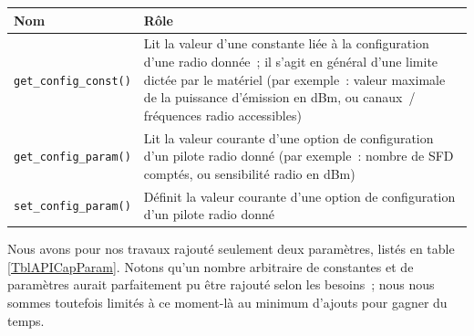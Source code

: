 \begin{table}[!hbt]
\centering

\begin{tabular}{|l|p{9cm}|}
\hline
\textbf{Nom} & \textbf{Rôle} \\
\hline
\texttt{get\_config\_const()} & Lit la valeur d'une constante liée à la
                                configuration d'une radio donnée~; il s'agit
                                en général d'une limite dictée par le matériel
                                (par exemple~: valeur maximale de la puissance
                                 d'émission en dBm, ou canaux~/ fréquences
                                 radio accessibles) \\
\hline
\texttt{get\_config\_param()} & Lit la valeur courante d'une option de
                                configuration d'un pilote radio donné
                                (par exemple~: nombre de SFD comptés, ou
                                 sensibilité radio en dBm) \\
\hline
\texttt{set\_config\_param()} & Définit la valeur courante d'une option
                                de configuration d'un pilote radio donné \\
\hline
\end{tabular}

\label{TblAPICapFnct}
\end{table}


Nous avons pour nos travaux rajouté seulement deux paramètres, listés en
table \vref{TblAPICapParam}. Notons qu'un nombre arbitraire de constantes et
de paramètres aurait parfaitement pu être rajouté selon les besoins~;
nous nous sommes toutefois limités à ce moment-là au minimum d'ajouts pour
gagner du temps.


